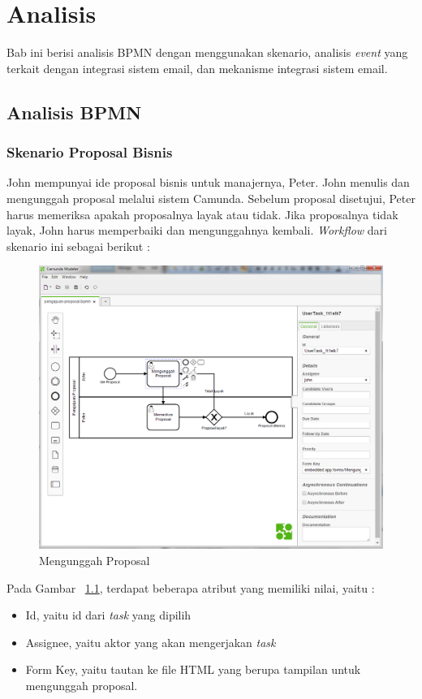 \chapter{Analisis}
\label{chap:analisis}
Bab ini berisi analisis BPMN dengan menggunakan skenario, analisis \textit{event} yang terkait dengan integrasi sistem email, dan mekanisme integrasi sistem email.
\section{Analisis BPMN}
\label{sec:analisisbpmn}

\subsection{Skenario Proposal Bisnis}
\label{skenario1}
John mempunyai ide proposal bisnis untuk manajernya, Peter. John menulis dan mengunggah proposal melalui sistem Camunda. Sebelum proposal disetujui, Peter harus memeriksa apakah proposalnya layak atau tidak. Jika proposalnya tidak layak, John harus memperbaiki dan mengunggahnya kembali. \textit{Workflow} dari skenario ini sebagai berikut :
		\begin{figure}[H]
			\centering
			\includegraphics[scale=0.5]{Gambar/Bab-3/Kasus1-2}
			\caption{Mengunggah Proposal} 
			\label{fig:mengunggahproposal}
		\end{figure}
		
Pada Gambar ~\ref{fig:mengunggahproposal}, terdapat beberapa atribut yang memiliki nilai, yaitu :
\begin{itemize}
	\item Id, yaitu id dari \textit{task} yang dipilih
	\item Assignee, yaitu aktor yang akan mengerjakan \textit{task}
	\item Form Key, yaitu tautan ke file HTML yang berupa tampilan untuk mengunggah proposal.
\end{itemize}

